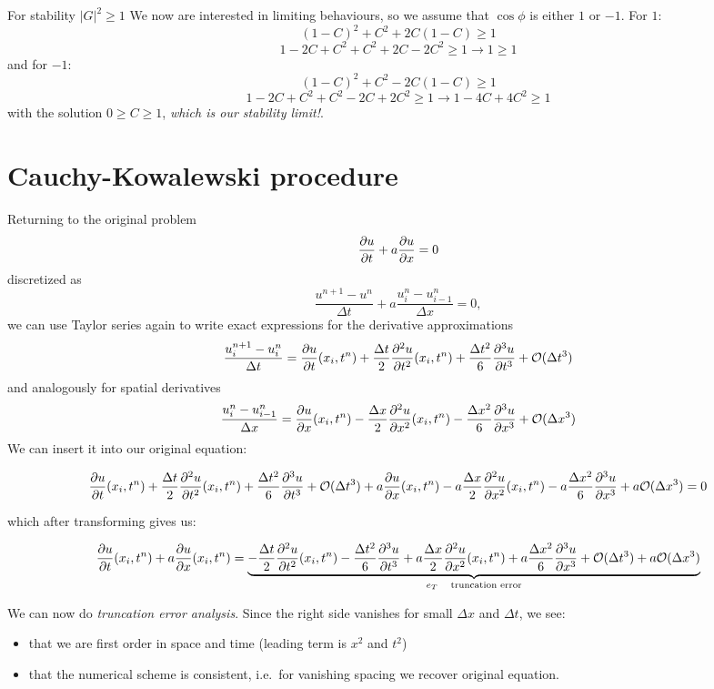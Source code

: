 \documentclass[justified, nobib,a4paper]{tufte-handout}
\begin{document}
For stability ${|G|}^2 \geq 1$
We now are interested in limiting behaviours, so we assume that $\cos\phi$ is either $1$ or $-1$.
For $1$:
\[
	{(1-C)}^2 + C^2 + 2C(1-C) \geq 1
\]
\[
	1 - 2C +C^2 + C^2 + 2C- 2C^2 \geq 1 \rightarrow 1 \geq 1
\]
and for $-1$:
\[
	{(1-C)}^2 + C^2 - 2C(1-C) \geq 1
\]
\[
	1 - 2C + C^2 + C^2 - 2C + 2C^2 \geq 1 \rightarrow 1 - 4C + 4C^2 \geq 1
\]
with the solution $0 \geq C \geq 1$, \emph{which is our stability limit!}.

\section{Cauchy-Kowalewski procedure}
Returning to the original problem
\[
	\pdv{u}{t} + a\pdv{u}{x} = 0
\]
discretized as
\[
	\frac{u^{n+1} - u^n}{\Delta t}
	+ a \frac{u^n_{i} - u^n_{i-1}}{\Delta x}  = 0,
\]
we can use Taylor series again to write exact expressions for the derivative approximations
\[
	\frac{u_i^{n+1}-u_i^n}{\Delta t} = \pdv{u}{t}(x_i, t^n) + \frac{\Delta t}{2}\pdv[order=2]{u}{t}(x_i, t^n)
	+ \frac{\Delta t^2}{6}\pdv[order=3]{u}{t} + \mathcal{O}(\Delta t^3)
\]
and analogously for spatial derivatives
\[
	\frac{u_i^{n}-u_{i-1}^n}{\Delta x} = \pdv{u}{x}(x_i, t^n) - \frac{\Delta x}{2}\pdv[order=2]{u}{x}(x_i, t^n)
	- \frac{\Delta x^2}{6}\pdv[order=3]{u}{x} + \mathcal{O}(\Delta x^3)
\]
We can insert it into our original equation:
\begin{fullwidth}
	\[
		\pdv{u}{t}(x_i, t^n) + \frac{\Delta t}{2}\pdv[order=2]{u}{t}(x_i, t^n)
		+ \frac{\Delta t^2}{6}\pdv[order=3]{u}{t} + \mathcal{O}(\Delta t^3)
		+ a\pdv{u}{x}(x_i, t^n) - a\frac{\Delta x}{2}\pdv[order=2]{u}{x}(x_i, t^n)
		- a\frac{\Delta x^2}{6}\pdv[order=3]{u}{x} + a\mathcal{O}(\Delta x^3)
		=0
	\]
\end{fullwidth}
which after transforming gives us:
\begin{fullwidth}
	\[
		\pdv{u}{t}(x_i, t^n) + a\pdv{u}{x}(x_i, t^n)
		=
		\underbrace{
			- \frac{\Delta t}{2}\pdv[order=2]{u}{t}(x_i, t^n)
			- \frac{\Delta t^2}{6}\pdv[order=3]{u}{t}
			+ a\frac{\Delta x}{2}\pdv[order=2]{u}{x}(x_i, t^n)
			+ a\frac{\Delta x^2}{6}\pdv[order=3]{u}{x}
			+ \mathcal{O}(\Delta t^3) + a\mathcal{O}(\Delta x^3)
		}_{e_T\quad\text{truncation error}}
	\]
\end{fullwidth}
We can now do \emph{truncation error analysis}. Since the right side vanishes for small $\Delta x$ and $\Delta t$,
we see:
\begin{itemize}
	\item that we are first order in space and time (leading term is $x^2$ and $t^2$)
	\item that the numerical scheme is consistent, i.e.\ for vanishing spacing we recover original equation.
\end{itemize}
\end{document}
